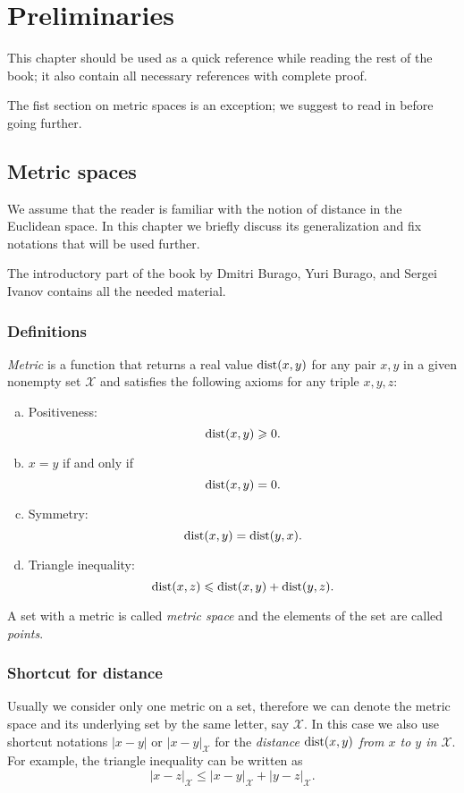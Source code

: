 \addtocounter{chapter}{-1}
\chapter{Preliminaries}

This chapter should be used as a quick reference while reading the rest of the book;
it also contain all necessary references with complete proof.

The fist section on metric spaces is an exception;
we suggest to read in before going further.

\section{Metric spaces}\label{sec:metric-spcaes}

We assume that the reader is familiar with the notion of distance in the 
Euclidean space.
In this chapter we briefly discuss its generalization and fix notations that will be used further.

The introductory part of the book by Dmitri Burago, Yuri Burago, and Sergei Ivanov \cite{burago-burago-ivanov} contains all the needed material.

\subsection*{Definitions}

\emph{Metric} is a function that returns a real value $\mathop{\rm dist}\nolimits(x,y)$ for any pair $x,y$ in a given nonempty set $\mathcal X$  and satisfies the following axioms for any triple $x,y,z$: \label{page:def:metric}
\begin{enumerate}[(a)]
\item\label{def:metric-space:a} Positiveness: 
$$\mathop{\rm dist}\nolimits(x,y)\geqslant 0.$$
\item\label{def:metric-space:b} $x=y$ if and only if 
$$\mathop{\rm dist}\nolimits(x,y)=0.$$
\item\label{def:metric-space:c} Symmetry: $$\mathop{\rm dist}\nolimits(x, y) = \mathop{\rm dist}\nolimits(y, x).$$
\item\label{def:metric-space:d} Triangle inequality: 
$$\mathop{\rm dist}\nolimits(x, z) \leqslant \mathop{\rm dist}\nolimits(x, y) + \mathop{\rm dist}\nolimits(y, z).$$
\end{enumerate}

A set with a metric is called \emph{metric space} and the elements of the set are called \emph{points}.

\subsection*{Shortcut for distance}
Usually we consider only one metric on a set, therefore we can denote the metric space and its underlying set by the same letter, say $\mathcal X$.
In this case we also use shortcut notations $|x-y|$ or $|x-y|_{\mathcal X}$  for the {}\emph{distance $\mathop{\rm dist}\nolimits(x,y)$ from $x$ to $y$ in $\mathcal X$}.
For example, the triangle inequality can be written as 
$$|x-z|_{\mathcal X}\le |x-y|_{\mathcal X}+|y-z|_{\mathcal X}.$$

